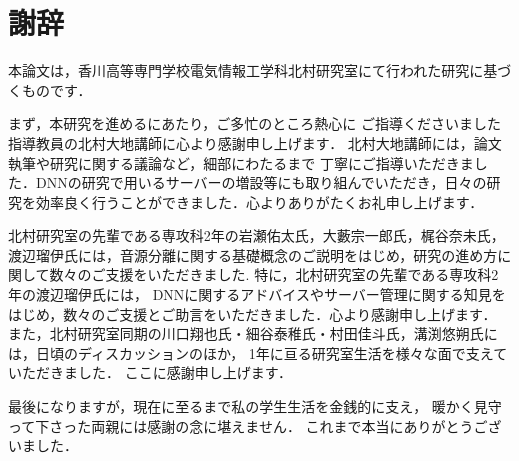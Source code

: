\chapter{謝辞}

本論文は，香川高等専門学校電気情報工学科北村研究室にて行われた研究に基づくものです．

まず，本研究を進めるにあたり，ご多忙のところ熱心に
ご指導くださいました指導教員の北村大地講師に心より感謝申し上げます．
北村大地講師には，論文執筆や研究に関する議論など，細部にわたるまで
丁寧にご指導いただきました．DNNの研究で用いるサーバーの増設等にも取り組んでいただき，日々の研究を効率良く行うことができました．心よりありがたくお礼申し上げます．

北村研究室の先輩である専攻科2年の岩瀬佑太氏，大藪宗一郎氏，梶谷奈未氏，渡辺瑠伊氏には，音源分離に関する基礎概念のご説明をはじめ，研究の進め方に関して数々のご支援をいただきました.
特に，北村研究室の先輩である専攻科2年の渡辺瑠伊氏には，
DNNに関するアドバイスやサーバー管理に関する知見をはじめ，数々のご支援とご助言をいただきました．心より感謝申し上げます．
また，北村研究室同期の川口翔也氏・細谷泰稚氏・村田佳斗氏，溝渕悠朔氏には，日頃のディスカッションのほか，
1年に亘る研究室生活を様々な面で支えていただきました．
ここに感謝申し上げます．

最後になりますが，現在に至るまで私の学生生活を金銭的に支え，
暖かく見守って下さった両親には感謝の念に堪えません．
これまで本当にありがとうございました．
